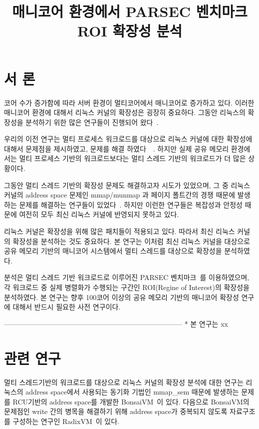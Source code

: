 \documentclass{kcc}
\title{매니코어 환경에서 PARSEC 벤치마크 ROI 확장성 분석}
\author{
}
\begin{document}
\maketitle

\section{서 론}
코어 수가 증가함에 따라 서버 환경이 멀티코어에서 매니코어로 증가하고 있다. 
이러한 매니코어 환경에 대해서 리눅스 커널의 확장성은 굉장히 중요하다. 
그동안 리눅스의 확장성을 분석하기 위한 많은 연구들이 진행되어 왔다~\cite{Etri}. 

우리의 이전 연구는 멀티 프로세스 워크로드를 대상으로 리눅스 커널에 대한 확장성에 
대해서 문제점을 제시하였고, 문제를 해결 하였다~\cite{kesl1}~\cite{kesl2}. 
하지만 실제 공유 메모리 환경에서는 멀티 프로세스 기반의 워크로드보다는 멀티 스레드 기반의 
워크로드가 더 많은 상황이다.

그동안 멀티 스레드 기반의 확장성 문제도 해결하고자 시도가 있었으며, 
그 중 리눅스 커널의 address space 문제인 mmap/munmap 과 페이지 폴트간의 경쟁 
때문에 발생하는 문제를 해결하는 연구들이 있었다~\cite{AustinTClements2012RCUBalancedTrees}. 
하지만 이런한 연구들은 복잡성과 안정성 때문에 
여전히 모두 최신 리눅스 커널에 반영되지 못하고 있다.

리눅스 커널은 확장성을 위해 많은 패치들이 적용되고 있다. 
따라서 최신 리눅스 커널의 확장성을 분석하는 것도 중요하다. 
본 연구는 이처럼 최신 리눅스 커널을 대상으로 
공유 메모리 기반의 매니코어 시스템에서 멀티 스레드를 
대상으로 확장성을 분석하였다.

분석은 멀티 스레드 기반 워크로드로 이루어진 PARSEC 벤치마크~\cite{parsecbench}를 이용하였으며, 각 워크로드 중
실제 병렬화가 수행되는 구간인 ROI(Regine of Interest)의 확장성을 분석하였다. 
본 연구는 향후 100코어 이상의 공유 메모리 기반의 매니코어 확장성 연구에 대해서 
반드시 필요한 사전 연구이다.

-----------------------------------------------------------------------------
* 본 연구는 xx




\section{관련 연구}

멀티 스레드기반의 워크로드를 대상으로 리눅스 커널의 확장성 분석에 대한 연구는 리눅스의 
address space에서 사용되는 동기화 기법인 mmap\_sem 때문에 발생하는 문제를 RCU기반의 
address space를 개발한 BonsaiVM~\cite{AustinTClements2012RCUBalancedTrees}이 있다.
다음으로 BonsaiVM의 문제점인 write 간의 병목을 해결하기 위해 address space가 중복되지 
않도록 자료구조를 구성하는 연구인 RadixVM~\cite{Clements2013RadixVM}이 있다.
\end{document}
